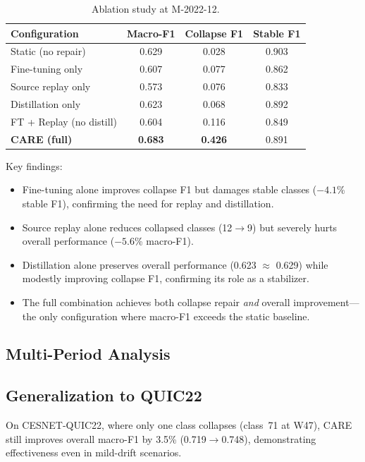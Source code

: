 \documentclass[journal]{IEEEtran}
\newcommand{\ours}{CARE}  %
\begin{document}
\begin{table}[t]
\centering
\caption{Ablation study at M-2022-12.}
\label{tab:ablation}
\small
\begin{tabular}{@{}l ccc@{}}
\toprule
Configuration & Macro-F1 & Collapse F1 & Stable F1 \\
\midrule
Static (no repair)       & 0.629 & 0.028 & 0.903 \\
Fine-tuning only         & 0.607 & 0.077 & 0.862 \\
Source replay only       & 0.573 & 0.076 & 0.833 \\
Distillation only        & 0.623 & 0.068 & 0.892 \\
FT + Replay (no distill) & 0.604 & 0.116 & 0.849 \\
\midrule
\textbf{\ours{} (full)}  & \textbf{0.683} & \textbf{0.426} & 0.891 \\
\bottomrule
\end{tabular}
\end{table}

Key findings:
\begin{itemize}
  \item Fine-tuning alone improves collapse F1 but damages stable classes ($-4.1$\% stable F1), confirming the need for replay and distillation.
  \item Source replay alone reduces collapsed classes (12$\to$9) but severely hurts overall performance ($-5.6$\% macro-F1).
  \item Distillation alone preserves overall performance (0.623 $\approx$ 0.629) while modestly improving collapse F1, confirming its role as a stabilizer.
  \item The full combination achieves both collapse repair \textit{and} overall improvement---the only configuration where macro-F1 exceeds the static baseline.
\end{itemize}

\subsection{Multi-Period Analysis}


\subsection{Generalization to QUIC22}

On CESNET-QUIC22, where only one class collapses (class~71 at W47), \ours{} still improves overall macro-F1 by 3.5\% (0.719$\to$0.748), demonstrating effectiveness even in mild-drift scenarios.
\end{document}
